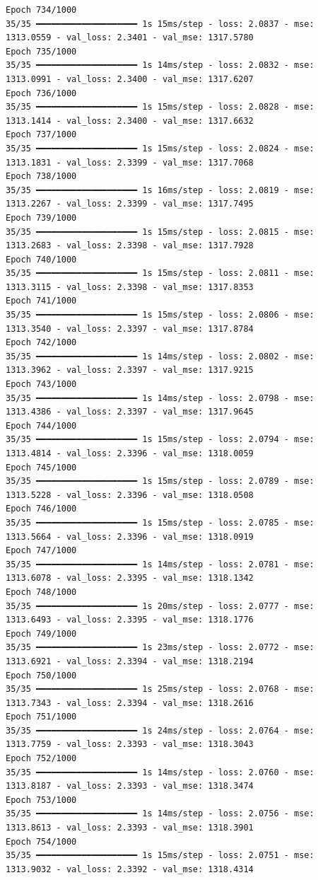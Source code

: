 \documentclass[
  letterpaper,
  DIV=11,
  numbers=noendperiod]{scrreprt}
\begin{document}
\begin{verbatim}
Epoch 734/1000
35/35 ━━━━━━━━━━━━━━━━━━━━ 1s 15ms/step - loss: 2.0837 - mse: 1313.0559 - val_loss: 2.3401 - val_mse: 1317.5780
Epoch 735/1000
35/35 ━━━━━━━━━━━━━━━━━━━━ 1s 14ms/step - loss: 2.0832 - mse: 1313.0991 - val_loss: 2.3400 - val_mse: 1317.6207
Epoch 736/1000
35/35 ━━━━━━━━━━━━━━━━━━━━ 1s 15ms/step - loss: 2.0828 - mse: 1313.1414 - val_loss: 2.3400 - val_mse: 1317.6632
Epoch 737/1000
35/35 ━━━━━━━━━━━━━━━━━━━━ 1s 15ms/step - loss: 2.0824 - mse: 1313.1831 - val_loss: 2.3399 - val_mse: 1317.7068
Epoch 738/1000
35/35 ━━━━━━━━━━━━━━━━━━━━ 1s 16ms/step - loss: 2.0819 - mse: 1313.2267 - val_loss: 2.3399 - val_mse: 1317.7495
Epoch 739/1000
35/35 ━━━━━━━━━━━━━━━━━━━━ 1s 15ms/step - loss: 2.0815 - mse: 1313.2683 - val_loss: 2.3398 - val_mse: 1317.7928
Epoch 740/1000
35/35 ━━━━━━━━━━━━━━━━━━━━ 1s 15ms/step - loss: 2.0811 - mse: 1313.3115 - val_loss: 2.3398 - val_mse: 1317.8353
Epoch 741/1000
35/35 ━━━━━━━━━━━━━━━━━━━━ 1s 15ms/step - loss: 2.0806 - mse: 1313.3540 - val_loss: 2.3397 - val_mse: 1317.8784
Epoch 742/1000
35/35 ━━━━━━━━━━━━━━━━━━━━ 1s 14ms/step - loss: 2.0802 - mse: 1313.3962 - val_loss: 2.3397 - val_mse: 1317.9215
Epoch 743/1000
35/35 ━━━━━━━━━━━━━━━━━━━━ 1s 14ms/step - loss: 2.0798 - mse: 1313.4386 - val_loss: 2.3397 - val_mse: 1317.9645
Epoch 744/1000
35/35 ━━━━━━━━━━━━━━━━━━━━ 1s 15ms/step - loss: 2.0794 - mse: 1313.4814 - val_loss: 2.3396 - val_mse: 1318.0059
Epoch 745/1000
35/35 ━━━━━━━━━━━━━━━━━━━━ 1s 15ms/step - loss: 2.0789 - mse: 1313.5228 - val_loss: 2.3396 - val_mse: 1318.0508
Epoch 746/1000
35/35 ━━━━━━━━━━━━━━━━━━━━ 1s 15ms/step - loss: 2.0785 - mse: 1313.5664 - val_loss: 2.3396 - val_mse: 1318.0919
Epoch 747/1000
35/35 ━━━━━━━━━━━━━━━━━━━━ 1s 14ms/step - loss: 2.0781 - mse: 1313.6078 - val_loss: 2.3395 - val_mse: 1318.1342
Epoch 748/1000
35/35 ━━━━━━━━━━━━━━━━━━━━ 1s 20ms/step - loss: 2.0777 - mse: 1313.6493 - val_loss: 2.3395 - val_mse: 1318.1776
Epoch 749/1000
35/35 ━━━━━━━━━━━━━━━━━━━━ 1s 23ms/step - loss: 2.0772 - mse: 1313.6921 - val_loss: 2.3394 - val_mse: 1318.2194
Epoch 750/1000
35/35 ━━━━━━━━━━━━━━━━━━━━ 1s 25ms/step - loss: 2.0768 - mse: 1313.7343 - val_loss: 2.3394 - val_mse: 1318.2616
Epoch 751/1000
35/35 ━━━━━━━━━━━━━━━━━━━━ 1s 24ms/step - loss: 2.0764 - mse: 1313.7759 - val_loss: 2.3393 - val_mse: 1318.3043
Epoch 752/1000
35/35 ━━━━━━━━━━━━━━━━━━━━ 1s 14ms/step - loss: 2.0760 - mse: 1313.8187 - val_loss: 2.3393 - val_mse: 1318.3474
Epoch 753/1000
35/35 ━━━━━━━━━━━━━━━━━━━━ 1s 14ms/step - loss: 2.0756 - mse: 1313.8613 - val_loss: 2.3393 - val_mse: 1318.3901
Epoch 754/1000
35/35 ━━━━━━━━━━━━━━━━━━━━ 1s 15ms/step - loss: 2.0751 - mse: 1313.9032 - val_loss: 2.3392 - val_mse: 1318.4314

\end{verbatim}
\end{document}
